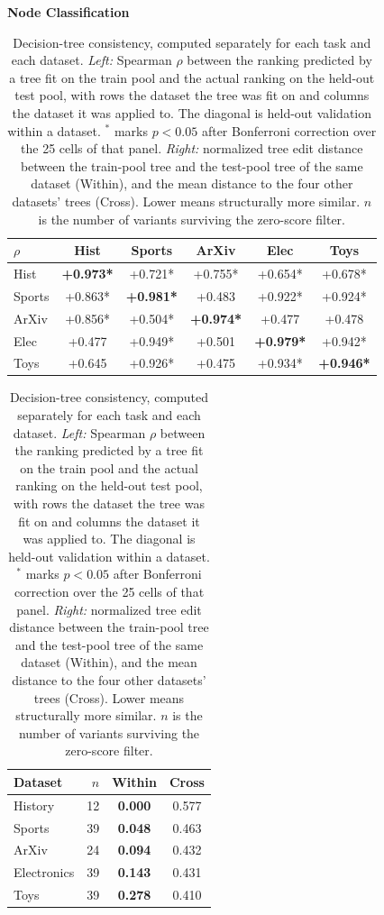 \begin{table}[htbp]
\centering
\renewcommand{\arraystretch}{1.25}
\small
\setlength{\tabcolsep}{3.7pt}

\caption{Decision-tree consistency, computed separately for each task and each dataset. \textit{Left:} Spearman $\rho$ between the ranking predicted by a tree fit on the train pool and the actual ranking on the held-out test pool, with rows the dataset the tree was fit on and columns the dataset it was applied to. The diagonal is held-out validation within a dataset. $^{*}$ marks $p<0.05$ after Bonferroni correction over the 25 cells of that panel. \textit{Right:} normalized tree edit distance between the train-pool tree and the test-pool tree of the same dataset (Within), and the mean distance to the four other datasets' trees (Cross). Lower means structurally more similar. $n$ is the number of variants surviving the zero-score filter.}
\label{tab:dt_consistency}

\textbf{Node Classification}

\begin{tabular}[t]{lccccc}
\toprule
$\rho$ & Hist & Sports & ArXiv & Elec & Toys \\
\midrule
Hist  & \textbf{+0.973*} & +0.721* & +0.755* & +0.654* & +0.678* \\
Sports& +0.863* & \textbf{+0.981*} & +0.483\phantom{*} & +0.922* & +0.924* \\
ArXiv & +0.856* & +0.504* & \textbf{+0.974*} & +0.477\phantom{*} & +0.478\phantom{*} \\
Elec  & +0.477\phantom{*} & +0.949* & +0.501\phantom{*} & \textbf{+0.979*} & +0.942* \\
Toys  & +0.645\phantom{*} & +0.926* & +0.475\phantom{*} & +0.934* & \textbf{+0.946*} \\
\bottomrule
\end{tabular}%
\hspace{1.5em}
\begin{tabular}[t]{lrcc}
\toprule
Dataset & $n$ & Within & Cross \\
\midrule
History     & 12 & \textbf{0.000} & 0.577 \\
Sports      & 39 & \textbf{0.048} & 0.463 \\
ArXiv       & 24 & \textbf{0.094} & 0.432 \\
Electronics & 39 & \textbf{0.143} & 0.431 \\
Toys        & 39 & \textbf{0.278} & 0.410 \\
\bottomrule
\end{tabular}


\end{table}
